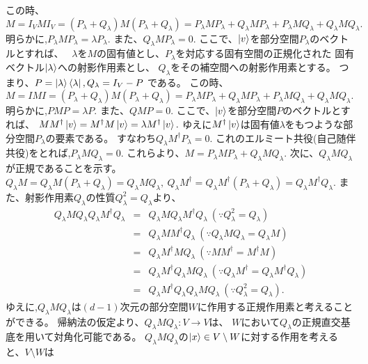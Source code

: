 この時、$M = I_VMI_V = 
(P_\lambda   + Q_\lambda ) M (P_\lambda  + Q_\lambda ) 
= P_\lambda  MP_\lambda  + Q_\lambda  M P_\lambda  + P_\lambda  M Q_\lambda  
+ Q_\lambda  M Q_\lambda  .$
明らかに,$P_\lambda MP_\lambda  = \lambda P_\lambda $. また、$Q_\lambda MP_\lambda  = 0.$
ここで、$\ket{v}$を部分空間$P_\lambda $のベクトルとすれば、
~$\lambda$を$M$の固有値とし、$P_\lambda$を対応する固有空間の正規化された
固有ベクトル$\ket{\lambda}$への射影作用素とし、
$Q_\lambda$をその補空間への射影作用素とする。
つまり、$P = \ket{\lambda} \bra{\lambda}, Q_\lambda = I_V - P$
である。
この時、$M = IMI = 
(P_\lambda  + Q_\lambda) M (P_\lambda + Q_\lambda) 
= P_\lambda MP_\lambda + Q_\lambda M P_\lambda + P_\lambda M Q_\lambda 
+ Q_\lambda M Q_\lambda .$
明らかに,$PMP = \lambda P$. また、$QMP = 0.$
ここで、$\ket{v}$を部分空間$P$のベクトルとすれば、
$MM^\dagger \ket{v} = M^\dagger M \ket{v} = \lambda M^\dagger \ket{v}.$
ゆえに$M^\dagger \ket{v}$は固有値$\lambda$をもつような部分空間$P_\lambda $の要素である。
すなわち$Q_\lambda M^\dagger P_\lambda  = 0.$
これのエルミート共役(自己随伴共役)をとれば,$P_\lambda MQ_\lambda  = 0.$
これらより、$M = P_\lambda MP_\lambda  + Q_\lambda MQ_\lambda .$
\newline
次に、$Q_\lambda MQ_\lambda $が正規であることを示す。
$Q_\lambda M = Q_\lambda M(P_\lambda  + Q_\lambda ) = Q_\lambda MQ_\lambda ,~ Q_\lambda M^\dagger = Q_\lambda M^\dagger (P_\lambda  + Q_\lambda ) = Q_\lambda M^\dagger Q_\lambda .$
また、射影作用素$Q_\lambda $の性質$Q_\lambda ^2 = Q_\lambda $より、
\begin{eqnarray*}
Q_\lambda MQ_\lambda Q_\lambda M^\dagger Q_\lambda  &=& Q_\lambda MQ_\lambda M^\dagger Q_\lambda ~(\because Q_\lambda ^2 = Q_\lambda )\\
&=& Q_\lambda MM^\dagger Q_\lambda ~(\because Q_\lambda MQ_\lambda  = Q_\lambda M)\\
&=&Q_\lambda M^\dagger M Q_\lambda ~(\because MM^\dagger = M^\dagger M)\\
&=& Q_\lambda M^\dagger Q_\lambda MQ_\lambda ~(\because Q_\lambda M^\dagger = Q_\lambda M^\dagger Q_\lambda )\\
&=& Q_\lambda M^\dagger Q_\lambda Q_\lambda MQ_\lambda ~(\because Q_\lambda ^2 = Q_\lambda ).
\end{eqnarray*}
ゆえに,$Q_\lambda MQ_\lambda $は$(d-1)$次元の部分空間$W$に作用する正規作用素と考えることができる。
帰納法の仮定より、$Q_\lambda MQ_\lambda :V \rightarrow V$は、
$W$において$Q_\lambda $の正規直交基底を用いて対角化可能である。
\newline
$Q_\lambda MQ_\lambda $の$\ket{x} \in V \setminus W$に対する作用を考えると、$V\setminus W$は
